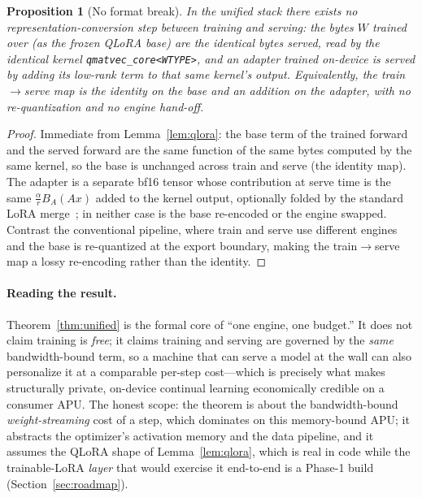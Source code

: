 \documentclass[11pt]{article}
\newtheorem{proposition}{Proposition}
\begin{document}
\begin{proposition}[No format break]
\label{prop:noseam}
In the unified stack there exists no representation-conversion step between training and serving: the bytes $W$ trained over (as the frozen QLoRA base) are the identical bytes served, read by the identical kernel \texttt{qmatvec\_core<WTYPE>}, and an adapter trained on-device is served by adding its low-rank term to that same kernel's output. Equivalently, the train$\to$serve map is the identity on the base and an addition on the adapter, with no re-quantization and no engine hand-off.
\end{proposition}

\begin{proof}
Immediate from Lemma~\ref{lem:qlora}: the base term of the trained forward and the served forward are the same function of the same bytes computed by the same kernel, so the base is unchanged across train and serve (the identity map). The adapter is a separate bf16 tensor whose contribution at serve time is the same $\tfrac{\alpha}{r}B_{\!A}(Ax)$ added to the kernel output, optionally folded by the standard LoRA merge~\cite{lora}; in neither case is the base re-encoded or the engine swapped. Contrast the conventional pipeline, where train and serve use different engines and the base is re-quantized at the export boundary, making the train$\to$serve map a lossy re-encoding rather than the identity.
\end{proof}

\paragraph{Reading the result.} Theorem~\ref{thm:unified} is the formal core of ``one engine, one budget.'' It does not claim training is \emph{free}; it claims training and serving are governed by the \emph{same} bandwidth-bound term, so a machine that can serve a model at the wall can also personalize it at a comparable per-step cost---which is precisely what makes structurally private, on-device continual learning economically credible on a consumer APU. The honest scope: the theorem is about the bandwidth-bound \emph{weight-streaming} cost of a step, which dominates on this memory-bound APU; it abstracts the optimizer's activation memory and the data pipeline, and it assumes the QLoRA shape of Lemma~\ref{lem:qlora}, which is real in code while the trainable-LoRA \emph{layer} that would exercise it end-to-end is a Phase-1 build (Section~\ref{sec:roadmap}).
\end{document}
